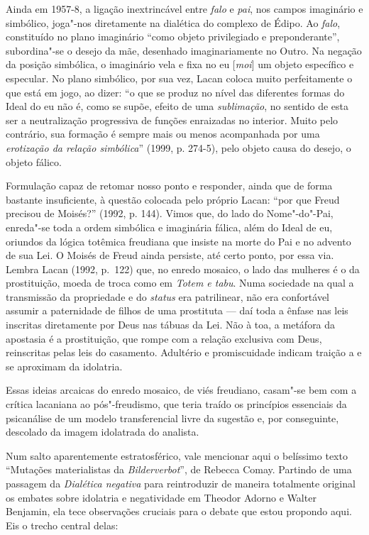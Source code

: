 Ainda em 1957-8, a ligação inextrincável entre \emph{falo} e \emph{pai},
nos campos imaginário e simbólico, joga"-nos diretamente na
dialética do complexo de Édipo. Ao \emph{falo}, constituído no plano
imaginário ``como objeto privilegiado e preponderante'', subordina"-se o
desejo da mãe, desenhado imaginariamente no Outro. Na negação da posição
simbólica, o imaginário vela e fixa no eu {[}\emph{moi}{]} um objeto específico
e especular. No plano simbólico, por sua vez, Lacan coloca muito
perfeitamente o que está em jogo, ao dizer: ``o que se produz no nível
das diferentes formas do Ideal do eu não é, como se supõe, efeito de uma
\emph{sublimação}, no sentido de esta ser a neutralização progressiva de
funções enraizadas no interior. Muito pelo contrário, sua formação é
sempre mais ou menos acompanhada por uma \emph{erotização da relação
simbólica}'' (1999, p. 274-5), pelo objeto causa do desejo, o objeto fálico.

Formulação capaz de retomar nosso ponto e responder, ainda que de forma
bastante insuficiente, à questão colocada pelo próprio Lacan: ``por que
Freud precisou de Moisés?'' (1992, p. 144). Vimos que, do lado
do Nome"-do"-Pai, enreda"-se toda a ordem simbólica e imaginária fálica,
além do Ideal de eu, oriundos da lógica totêmica freudiana que insiste
na morte do Pai e no advento de sua Lei. O Moisés de Freud ainda
persiste, até certo ponto, por essa via. Lembra Lacan (1992, p.~122) que, no enredo mosaico, o lado das mulheres é o da prostituição,
moeda de troca como em \emph{Totem e tabu}. Numa sociedade na qual a
transmissão da propriedade e do \emph{status} era patrilinear, não era
confortável assumir a paternidade de filhos de uma prostituta --- daí
toda a ênfase nas leis inscritas diretamente por Deus nas tábuas da Lei.
Não à toa, a metáfora da apostasia é a prostituição, que rompe com a
relação exclusiva com Deus, reinscritas pelas leis do casamento.
Adultério e promiscuidade indicam traição a  e se aproximam da
idolatria.

Essas ideias arcaicas do enredo mosaico, de viés freudiano, casam"-se bem
com a crítica lacaniana ao pós"-freudismo, que teria traído os princípios
essenciais da psicanálise de um modelo transferencial livre da sugestão
e, por conseguinte, descolado da imagem idolatrada do analista.

Num salto aparentemente estratosférico, vale mencionar aqui o belíssimo
texto ``Mutações materialistas da \emph{Bilderverbot}'', de Rebecca
Comay. Partindo de uma passagem da \emph{Dialética negativa} para
reintroduzir de maneira totalmente original os embates sobre idolatria e
negatividade em Theodor Adorno e Walter Benjamin, ela tece observações
cruciais para o debate que estou propondo aqui. Eis o trecho central
delas:


